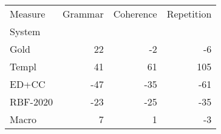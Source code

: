 \begin{tabular}{lrrr}
\toprule
Measure & Grammar & Coherence & Repetition \\
System &  &  &  \\
\midrule
Gold & 22 & -2 & -6 \\
Templ & 41 & 61 & 105 \\
ED+CC & -47 & -35 & -61 \\
RBF-2020 & -23 & -25 & -35 \\
Macro & 7 & 1 & -3 \\
\bottomrule
\end{tabular}
